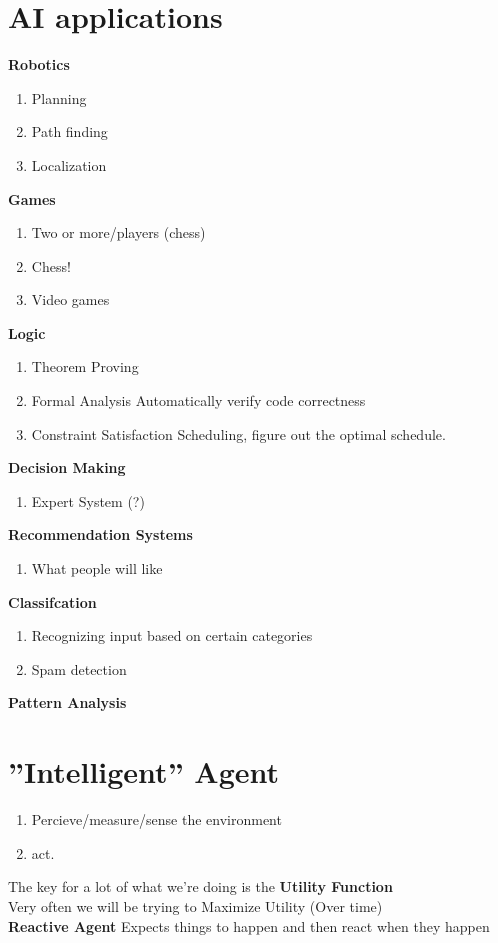 \documentclass{article}
\begin{document}
\section{AI applications}
\textbf{Robotics}
\begin{enumerate}
	\item Planning
	\item Path finding
	\item Localization
\end{enumerate}
\textbf{Games}
\begin{enumerate}
	\item Two or more/players (chess)
	\item Chess!
	\item Video games
\end{enumerate}
\textbf{Logic}
\begin{enumerate}
	\item Theorem Proving
	\item Formal Analysis \- Automatically verify code correctness
	\item Constraint Satisfaction \- Scheduling, figure out the optimal schedule.
\end{enumerate}
\textbf{Decision Making}
\begin{enumerate}
	\item Expert System \- (?)
\end{enumerate}
\textbf{Recommendation Systems}
\begin{enumerate}
	\item What people will like
\end{enumerate}
\textbf{Classifcation}
\begin{enumerate}
	\item Recognizing input based on certain categories
	\item Spam detection
\end{enumerate}
\textbf{Pattern Analysis}

\section{''Intelligent'' Agent}
\begin{enumerate}
	\item Percieve/measure/sense the environment
	\item act.
\end{enumerate}
The key for a lot of what we're doing is the \textbf{Utility Function}\\
Very often we will be trying to Maximize Utility (Over time)\\
\textbf{Reactive Agent} \- Expects things to happen and then react when they
happen
\end{document}
